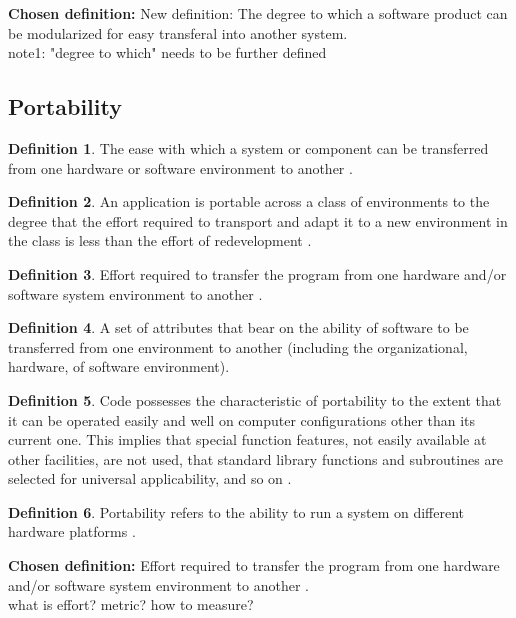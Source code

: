 \documentclass[letterpaper,cleveref]{lipics-v2019}
\theoremstyle{definition}
\newtheorem{defn}{Definition}
\begin{document}
\textbf{Chosen definition:}
New definition: The degree to which a software product can be modularized for easy transferal into another system.\\

note1: "degree to which" needs to be further defined\\



\subsection{Portability}
\begin{defn}
The ease with which a system or component can be transferred from one hardware or software environment to another \cite{IEEEStdGlossarySET1990}. \\
\end{defn}
\begin{defn}
An application is portable across a class of environments to the degree that the effort required to transport and adapt it to a new environment in the class is less than the effort of redevelopment \cite{mooney1990strategies}.\\
\end{defn}
\begin{defn}
Effort required to transfer the program from one hardware and/or software system environment to another \cite{pressman2005software}.\\
\end{defn}
\begin{defn}
A set of attributes that bear on the ability of software to be transferred from one environment to another (including the organizational, hardware, of software environment)\cite{pfleeger2006software}.\\
\end{defn}
\begin{defn}
Code possesses the characteristic of portability to the extent that it can be operated easily and well on computer configurations other than its current one. This implies that special function features, not easily available at other facilities, are not used, that standard library functions and subroutines are selected for universal applicability, and so on \cite{boehm2007software}.
\end{defn}
\begin{defn}
Portability refers to the ability to run a system on different hardware platforms \cite{ghezzi1991fundamentals}.
\end{defn}
\textbf{Chosen definition:} Effort required to transfer the program from one hardware and/or software system environment to another \cite{pressman2005software}.\\
what is effort? metric? how to measure?\\
\end{document}
